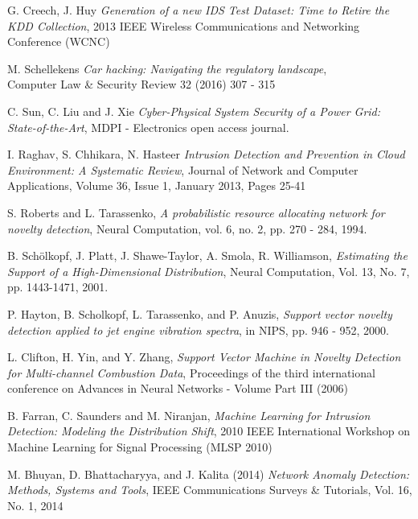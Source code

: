 \documentclass[reqno,openany,12pt]{amsbook}
\begin{document}
 
\backmatter
\begin{thebibliography}{99}


 G. Creech, J. Huy \emph{Generation of a new IDS Test Dataset: Time to Retire the KDD Collection}, 
2013 IEEE Wireless Communications and Networking Conference (WCNC)

 M. Schellekens \emph{Car hacking: Navigating the regulatory landscape},\\ Computer Law \& Security Review 32 (2016) 307 - 315

 C. Sun, C. Liu and J. Xie \emph{Cyber-Physical System Security of a Power Grid: State-of-the-Art}, MDPI - Electronics open access journal.

 I. Raghav, S. Chhikara, N. Hasteer \emph{Intrusion Detection and Prevention in Cloud Environment: A Systematic Review}, Journal of Network and Computer Applications, Volume 36, Issue 1, January 2013, Pages 25-41

 S. Roberts and L. Tarassenko, \emph{A probabilistic resource allocating
network for novelty detection}, Neural Computation, vol. 6, no. 2,
pp. 270 - 284, 1994.

 	B. Schölkopf, J. Platt, J. Shawe-Taylor, A. Smola, R. Williamson, \emph{Estimating the Support of a High-Dimensional Distribution}, Neural Computation, Vol. 13, No. 7, pp. 1443-1471, 2001.

 P. Hayton, B. Scholkopf, L. Tarassenko, and P. Anuzis, \emph{Support vector novelty detection applied to jet engine vibration spectra}, in NIPS, pp. 946 - 952, 2000.

 L. Clifton, H. Yin, and Y. Zhang, \emph{Support Vector Machine in Novelty Detection for Multi-channel Combustion Data}, Proceedings of the third international conference on Advances in Neural Networks - Volume Part III (2006)

 B. Farran, C. Saunders and M. Niranjan, \emph{Machine Learning for Intrusion Detection: Modeling the Distribution Shift}, 2010 IEEE International Workshop on Machine Learning for Signal Processing (MLSP 2010)

 M. Bhuyan, D. Bhattacharyya, and J. Kalita (2014) \emph{Network Anomaly Detection: Methods, Systems and Tools}, IEEE Communications Surveys \& Tutorials, Vol. 16, No. 1, 2014


\end{thebibliography}
\end{document}
